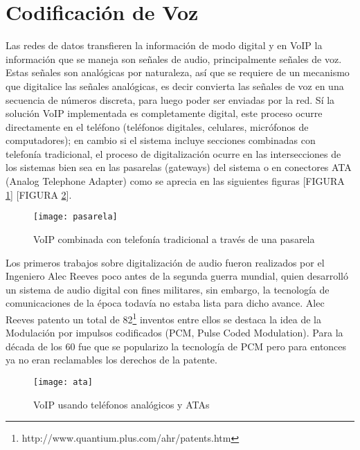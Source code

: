 	
\section{Codificación de Voz}

Las redes de datos transfieren la información de modo digital 
y en VoIP la información que se maneja son señales de audio, 
principalmente señales de voz. Estas señales son analógicas 
por naturaleza, así que se requiere de un mecanismo que 
digitalice las señales analógicas, es decir convierta las 
señales de voz en una secuencia de números discreta, para 
luego poder ser enviadas por la red. Sí la solución VoIP 
implementada es completamente digital, este proceso ocurre 
directamente en el teléfono (teléfonos digitales, celulares, 
micrófonos de computadores); en cambio si el sistema incluye 
secciones combinadas con telefonía tradicional, el proceso de 
digitalización ocurre en las intersecciones de los sistemas 
bien sea en las pasarelas (gateways) del sistema o en conectores 
ATA (Analog Telephone Adapter) como se aprecia en las siguientes 
figuras [FIGURA \ref{fig:pasarela}]  [FIGURA \ref{fig:ata}].

	\begin{figure}[h]
		
		\texttt{[image: pasarela]}
		
		\caption{VoIP combinada con telefonía tradicional a través de una pasarela}
		
		\centering
		
		\label{fig:pasarela}
	\end{figure}

Los primeros trabajos sobre digitalización de audio fueron realizados 
por el Ingeniero Alec Reeves poco antes de la segunda guerra mundial, quien desarrolló un sistema de audio digital con fines militares, 
sin embargo, la tecnología de comunicaciones de la época todavía 
no estaba lista para dicho avance. Alec Reeves patento un total 
de 82\footnote{ http://www.quantium.plus.com/ahr/patents.htm } 
inventos entre ellos se destaca la idea de la Modulación por 
impulsos codificados (PCM, Pulse Coded Modulation). Para la 
década de los 60 fue que se popularizo la tecnología de PCM 
pero para entonces ya no eran reclamables los derechos de la 
patente. 

	
		\begin{figure}[h]
			
			\texttt{[image: ata]}
			
			\caption{VoIP usando teléfonos analógicos y ATAs}
			
			\centering
			
			\label{fig:ata}
		\end{figure}
		
